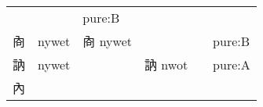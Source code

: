 \documentclass[14pt,a4paper]{scrartcl}
\begin{document}
\begin{longtable}[c]{@{}llllll@{}}
\begin{minipage}[t]{0.14\columnwidth}\raggedright\strut
\strut\end{minipage} &
\begin{minipage}[t]{0.14\columnwidth}\raggedright\strut
\strut\end{minipage} &
\begin{minipage}[t]{0.14\columnwidth}\raggedright\strut
pure:B
\strut\end{minipage}\tabularnewline
\begin{minipage}[t]{0.14\columnwidth}\raggedright\strut
㕯
\strut\end{minipage} &
\begin{minipage}[t]{0.14\columnwidth}\raggedright\strut
nywet
\strut\end{minipage} &
\begin{minipage}[t]{0.14\columnwidth}\raggedright\strut
㕯 nywet
\strut\end{minipage} &
\begin{minipage}[t]{0.14\columnwidth}\raggedright\strut
\strut\end{minipage} &
\begin{minipage}[t]{0.14\columnwidth}\raggedright\strut
\strut\end{minipage} &
\begin{minipage}[t]{0.14\columnwidth}\raggedright\strut
pure:B
\strut\end{minipage}\tabularnewline
\begin{minipage}[t]{0.14\columnwidth}\raggedright\strut
訥
\strut\end{minipage} &
\begin{minipage}[t]{0.14\columnwidth}\raggedright\strut
nywet
\strut\end{minipage} &
\begin{minipage}[t]{0.14\columnwidth}\raggedright\strut
\strut\end{minipage} &
\begin{minipage}[t]{0.14\columnwidth}\raggedright\strut
訥 nwot
\strut\end{minipage} &
\begin{minipage}[t]{0.14\columnwidth}\raggedright\strut
\strut\end{minipage} &
\begin{minipage}[t]{0.14\columnwidth}\raggedright\strut
pure:A
\strut\end{minipage}\tabularnewline
\begin{minipage}[t]{0.14\columnwidth}\raggedright\strut
內
\strut\end{minipage} &

\end{longtable}
\end{document}
